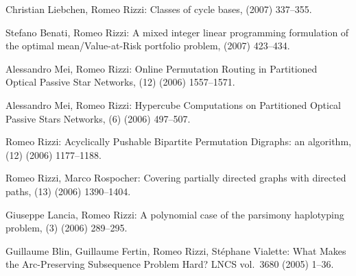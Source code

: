 \begin{etaremune}
  \item {\sc Christian Liebchen, Romeo Rizzi:}
   \newblock  Classes of cycle bases,
    (2007) 337--355.

  \item {\sc Stefano Benati, Romeo Rizzi:}
   \newblock  A mixed integer linear programming formulation
              of the optimal mean/Value-at-Risk portfolio problem,
    (2007) 423--434.

  \item {\sc Alessandro Mei, Romeo Rizzi:}
   \newblock  Online Permutation Routing in
              Partitioned Optical Passive Star Networks,
   (12) (2006) 1557--1571.

  \item {\sc Alessandro Mei, Romeo Rizzi:}
   \newblock  Hypercube Computations on Partitioned Optical
              Passive Stars Networks,
   (6) (2006) 497--507.

  \item {\sc Romeo Rizzi:}
   \newblock  Acyclically Pushable Bipartite Permutation Digraphs: an algorithm,
   (12) (2006) 1177--1188.

  \item {\sc Romeo Rizzi, Marco Rospocher:}
   \newblock  Covering partially directed graphs with directed paths,
   (13) (2006) 1390--1404.

  \item {\sc Giuseppe Lancia, Romeo Rizzi:}
   \newblock  A polynomial case of the parsimony haplotyping problem,
   (3) (2006) 289--295.

  \item {\sc Guillaume Blin, Guillaume Fertin, Romeo Rizzi,
                  St\'ephane Vialette:}
   \newblock What Makes the Arc-Preserving Subsequence Problem Hard?
   \newblock  LNCS vol.~3680 (2005) 1--36.


\end{etaremune}
